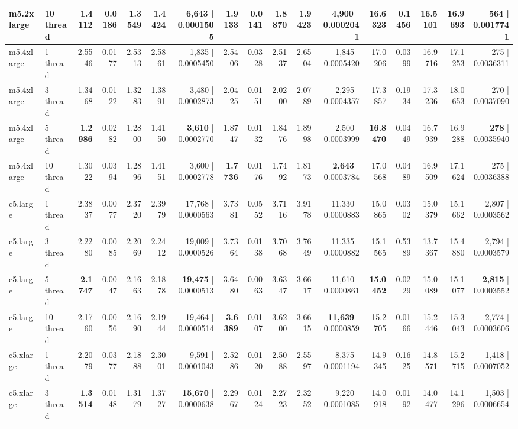 \documentclass[conference]{IEEEtran}
\begin{document}
\begin{table}[h]
{\begin{tabular}{ll|rrrrr|rrrrr|rrrrr}
			m5.2xlarge & 10 thread & \textbf{1.4112} & 0.0186 & 1.3549 & 1.4424 & \textbf{6,643} | 0.0001505 & \textbf{1.9133} & 0.0141 & 1.8870 & 1.9423 & \textbf{4,900} | 0.0002041 & 16.6323 & 0.1456 & 16.5101 & 16.9693 & 564 | 0.0017741 \\
			\midrule
			m5.4xlarge & 1 thread & 2.5546 & 0.0177 & 2.5313 & 2.5861 & 1,835 | 0.0005450 & 2.5406 & 0.0328 & 2.5137 & 2.6504 & 1,845 | 0.0005420 & 17.0206 & 0.0399 & 16.9716 & 17.1253 & 275 | 0.0036311 \\
			m5.4xlarge & 3 thread & 1.3468 & 0.0122 & 1.3283 & 1.3891 & 3,480 | 0.0002873 & 2.0425 & 0.0151 & 2.0200 & 2.0789 & 2,295 | 0.0004357 & 17.3857 & 0.1934 & 17.3236 & 18.0653 & 270 | 0.0037090 \\
			m5.4xlarge & 5 thread & \textbf{1.2986} & 0.0282 & 1.2800 & 1.4150 & \textbf{3,610} | 0.0002770 & 1.8747 & 0.0132 & 1.8476 & 1.8998 & 2,500 | 0.0003999 & \textbf{16.8470} & 0.0449 & 16.7939 & 16.9288 & \textbf{278} | 0.0035940 \\
			m5.4xlarge & 10 thread & 1.3022 & 0.0394 & 1.2896 & 1.4151 & 3,600 | 0.0002778 & \textbf{1.7736} & 0.0176 & 1.7492 & 1.8173 & \textbf{2,643} | 0.0003784 & 17.0568 & 0.0489 & 16.9509 & 17.1624 & 275 | 0.0036388 \\
			\midrule
			c5.large & 1 thread & 2.3837 & 0.0077 & 2.3720 & 2.3979 & 17,768 | 0.0000563 & 3.7381 & 0.0552 & 3.7116 & 3.9178 & 11,330 | 0.0000883 & 15.0865 & 0.0302 & 15.0379 & 15.1662 & 2,807 | 0.0003562 \\
			c5.large & 3 thread & 2.2280 & 0.0085 & 2.2069 & 2.2412 & 19,009 | 0.0000526 & 3.7364 & 0.0138 & 3.7068 & 3.7649 & 11,335 | 0.0000882 & 15.1565 & 0.5389 & 13.7367 & 15.4880 & 2,794 | 0.0003579 \\
			c5.large & 5 thread & \textbf{2.1747} & 0.0047 & 2.1663 & 2.1878 & \textbf{19,475} | 0.0000513 & 3.6480 & 0.0063 & 3.6347 & 3.6617 & 11,610 | 0.0000861 & \textbf{15.0452} & 0.0229 & 15.0089 & 15.1077 & \textbf{2,815} | 0.0003552 \\
			c5.large & 10 thread & 2.1760 & 0.0056 & 2.1690 & 2.1944 & 19,464 | 0.0000514 & \textbf{3.6389} & 0.0107 & 3.6200 & 3.6615 & \textbf{11,639} | 0.0000859 & 15.2705 & 0.0166 & 15.2446 & 15.3043 & 2,774 | 0.0003606 \\
			\midrule
			c5.xlarge & 1 thread & 2.2079 & 0.0377 & 2.1888 & 2.3001 & 9,591 | 0.0001043 & 2.5286 & 0.0120 & 2.5088 & 2.5597 & 8,375 | 0.0001194 & 14.9345 & 0.1625 & 14.8571 & 15.2715 & 1,418 | 0.0007052 \\
			c5.xlarge & 3 thread & \textbf{1.3514} & 0.0148 & 1.3179 & 1.3727 & \textbf{15,670} | 0.0000638 & 2.2967 & 0.0124 & 2.2723 & 2.3252 & 9,220 | 0.0001085 & 14.0918 & 0.0192 & 14.0477 & 14.1296 & 1,503 | 0.0006654 \\

\end{tabular}}
\end{table}
\end{document}
